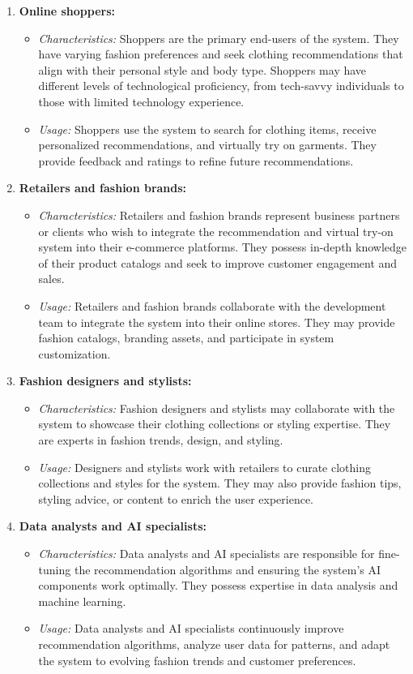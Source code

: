		\begin{enumerate}
			\item \textbf{Online shoppers:}
				\begin{itemize}
					\item \textit{Characteristics:} Shoppers are the primary end-users of the system. They have varying fashion preferences and seek clothing recommendations that align with their personal style and body type. Shoppers may have different levels of technological proficiency, from tech-savvy individuals to those with limited technology experience.
					\item \textit{Usage:} Shoppers use the system to search for clothing items, receive personalized recommendations, and virtually try on garments. They provide feedback and ratings to refine future recommendations.
				\end{itemize}
			\item \textbf{Retailers and fashion brands:}
				\begin{itemize}
					\item \textit{Characteristics:} Retailers and fashion brands represent business partners or clients who wish to integrate the recommendation and virtual try-on system into their e-commerce platforms. They possess in-depth knowledge of their product catalogs and seek to improve customer engagement and sales.
					\item \textit{Usage:} Retailers and fashion brands collaborate with the development team to integrate the system into their online stores. They may provide fashion catalogs, branding assets, and participate in system customization.
				\end{itemize}
			\item \textbf{Fashion designers and stylists:}
				\begin{itemize}
					\item \textit{Characteristics:} Fashion designers and stylists may collaborate with the system to showcase their clothing collections or styling expertise. They are experts in fashion trends, design, and styling.
					\item \textit{Usage:} Designers and stylists work with retailers to curate clothing collections and styles for the system. They may also provide fashion tips, styling advice, or content to enrich the user experience.
				\end{itemize}
			\item \textbf{Data analysts and AI specialists:}
				\begin{itemize}
					\item \textit{Characteristics:} Data analysts and AI specialists are responsible for fine-tuning the recommendation algorithms and ensuring the system's AI components work optimally. They possess expertise in data analysis and machine learning.
					\item \textit{Usage:} Data analysts and AI specialists continuously improve recommendation algorithms, analyze user data for patterns, and adapt the system to evolving fashion trends and customer preferences.
				\end{itemize}
		\end{enumerate}

